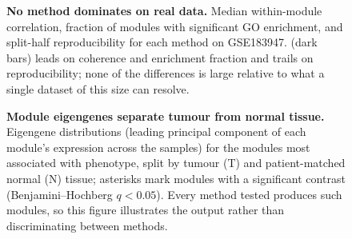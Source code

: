 \begin{table}[!ht]
\centering
\caption{\textbf{Comparative analysis of GSE183947.} All methods applied to the
same \EmpCompNTop{} most variable genes. ``assigned'' is the fraction of genes
placed in a module (WGCNA leaves some in its grey module); ``GO-enriched
modules'' counts modules with at least one \EmpCompLibrary{} term at adjusted
$p<0.05$ against the analysed gene set as background; ``split-half ARI'' compares
partitions fitted independently to two halves of the samples.}
\label{tab:empcomp}
\begin{adjustwidth}{-1.25in}{0in}
\centering
{}
\end{adjustwidth}
\end{table}

\begin{figure}[!h]
\caption{\textbf{No method dominates on real data.} Median within-module
correlation, fraction of modules with significant GO enrichment, and split-half
reproducibility for each method on GSE183947. \tool{} (dark bars) leads on
coherence and enrichment fraction and trails on reproducibility; none of the
differences is large relative to what a single dataset of this size can resolve.}
\label{fig:empcomp}
\end{figure}

\begin{figure}[!h]
\caption{\textbf{Module eigengenes separate tumour from normal tissue.}
Eigengene distributions (leading principal component of each module's expression
across the \EmpSamples{} samples) for the \tool{} modules most associated with
phenotype, split by tumour (T) and patient-matched normal (N) tissue; asterisks
mark modules with a significant contrast (Benjamini--Hochberg $q<0.05$). Every
method tested produces such modules, so this figure illustrates the output rather
than discriminating between methods.}
\label{fig:empirical}
\end{figure}


